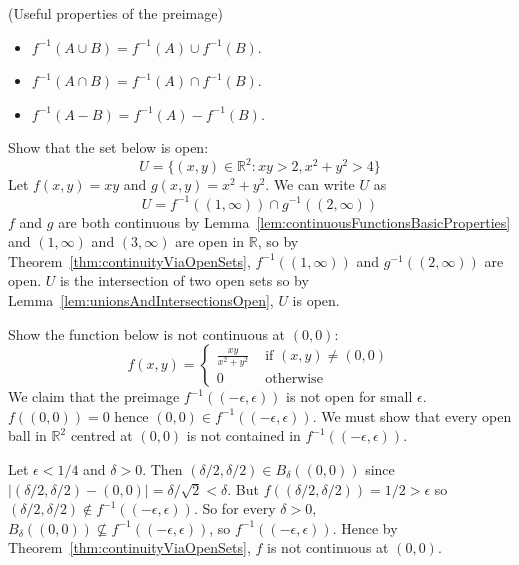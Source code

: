\begin{proposition}
	(Useful properties of the preimage)
	\begin{itemize}
		\item $f^{-1}(A \cup B) = f^{-1}(A) \cup f^{-1}(B)$.
		\item $f^{-1}(A \cap B) = f^{-1}(A) \cap f^{-1}(B)$.
		\item $f^{-1}(A - B) = f^{-1}(A) - f^{-1}(B)$.
	\end{itemize}
\end{proposition}

\begin{example}
	Show that the set below is open:
	\[
		U = \{ (x, y) \in \mathbb{R}^2: xy > 2, x^2 + y^2 > 4 \}
	\]
	Let $f(x, y) = xy$ and $g(x, y) = x^2 + y^2$. We can write $U$ as
	\[
		U = f^{-1}((1, \infty)) \cap g^{-1}((2, \infty))
	\]
	$f$ and $g$ are both continuous by Lemma~\ref{lem:continuousFunctionsBasicProperties} and $(1, \infty)$ and $(3, \infty)$ are open in $\mathbb{R}$, so by Theorem~\ref{thm:continuityViaOpenSets}, $f^{-1}((1, \infty))$ and $g^{-1}((2, \infty))$ are open. $U$ is the intersection of two open sets so by Lemma~\ref{lem:unionsAndIntersectionsOpen}, $U$ is open.
\end{example}

\begin{example}
	Show the function below is not continuous at $(0, 0)$:
	\[
		f(x, y) = \begin{cases}
			\frac{xy}{x^2 + y^2} & \text{ if } (x, y) \ne (0, 0) \\
			0 & \text{ otherwise}
		\end{cases}
	\]
	We claim that the preimage $f^{-1}((-\epsilon, \epsilon))$ is not open for small $\epsilon$. $f((0, 0)) = 0$ hence $(0, 0) \in f^{-1}((-\epsilon, \epsilon))$. We must show that every open ball in $\mathbb{R}^2$ centred at $(0, 0)$ is not contained in $f^{-1}((-\epsilon, \epsilon))$.
	
	Let $\epsilon < 1/4$ and $\delta > 0$. Then $(\delta / 2, \delta / 2) \in B_{\delta}((0, 0))$ since $|(\delta / 2, \delta / 2) - (0, 0)| = \delta / \sqrt{2} < \delta$. But $f((\delta / 2, \delta / 2)) = 1 / 2 > \epsilon$ so $(\delta / 2, \delta / 2) \notin f^{-1}((-\epsilon, \epsilon))$. So for every $\delta > 0$, $B_{\delta}((0, 0)) \not\subseteq f^{-1}((-\epsilon, \epsilon))$, so $f^{-1}((-\epsilon, \epsilon))$. Hence by Theorem~\ref{thm:continuityViaOpenSets}, $f$ is not continuous at $(0, 0)$.
\end{example}

